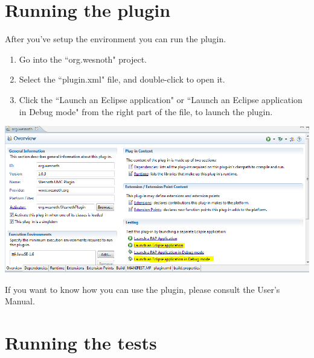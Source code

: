 \documentclass[10pt]{article}
\begin{document}
\section{Running the plugin}
After you've setup the environment you can run the plugin.
\begin{enumerate}
	\item Go into the ``org.wesnoth" project.
	\item Select the ``plugin.xml" file, and double-click to open it.
	\item Click the ``Launch an Eclipse application" or ``Launch an Eclipse application in Debug mode" from the right part of the file, to launch the plugin.
\end{enumerate}
\begin{center}
	\includegraphics[scale=0.6]{launch_plugin.png}
\end{center}

If you want to know how you can use the plugin, please consult the User's Manual.

\section{Running the tests}
\end{document}

